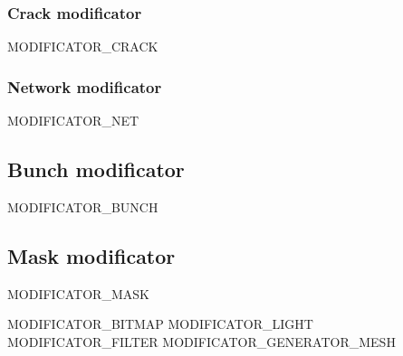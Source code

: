 \documentclass[11pt]{article}
\begin{document}
\subsubsection{Crack modificator}
MODIFICATOR\_CRACK
\subsubsection{Network modificator}
MODIFICATOR\_NET

\subsection{Bunch modificator}
MODIFICATOR\_BUNCH

\subsection{Mask modificator}
MODIFICATOR\_MASK

MODIFICATOR\_BITMAP
MODIFICATOR\_LIGHT
MODIFICATOR\_FILTER
MODIFICATOR\_GENERATOR\_MESH
\end{document}
